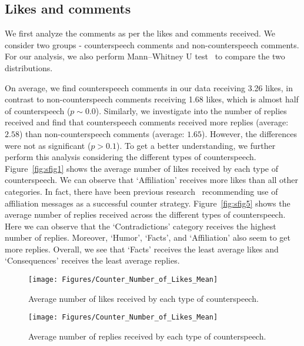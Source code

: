 \documentclass[11pt,a4paper]{article}
\newcommand{\TODO}[1]{\textcolor{red}{#1}}
\newcommand{\binny}[1]{\textcolor{blue}{[Binny: #1]}}
\begin{document}
{\subsection{Likes and comments}
We first analyze the comments as per the likes and comments received. We consider two groups - counterspeech comments and non-counterspeech comments. For our analysis, we also perform Mann–Whitney U test~\cite{mann1947test} to compare the two distributions. 




On average, we find counterspeech comments in our data receiving 3.26 likes, in contrast to non-counterspeech comments receiving 1.68 likes, which is almost half of counterspeech ($p\sim0.0$). Similarly, we investigate into the number of replies received and find that counterspeech comments received more replies (average: $2.58$) than non-counterspeech comments (average: $1.65$). However, the differences were not as significant ($p>0.1$). To get a better understanding, we further perform this analysis considering the different types of counterspeech. Figure~\ref{fig:sfig1} shows the average number of likes received by each type of counterspeech. We can observe that `Affiliation' receives more likes than all other categories. \iffalse\TODO{PG: but figure mentions identification}\binny{Corrected.}\fi In fact, there have been previous research~\citet{susan2016successfullcounter} recommending use of affiliation messages as a successful counter strategy.
Figure~\ref{fig:sfig5} shows the average number of replies received across the different types of counterspeech. Here we can observe that the `Contradictions' category receives the highest number of replies. Moreover, `Humor', `Facts', and `Affiliation' also seem to get more replies. Overall, we see that `Facts' receives the least average likes and `Consequences' receives the least average replies.\fi
\iffalse
\begin{figure*}[h]

	\begin{subfigure}[b]{0.45\textwidth}
		\texttt{[image: Figures/Counter\_Number\_of\_Likes\_Mean]}
		\caption{Average number of likes received by each type of counterspeech.}
		\label{fig:counter_num_likes}
	\end{subfigure}
	\qquad
	\centering	
	\begin{subfigure}[b]{0.45\textwidth}
		\texttt{[image: Figures/Counter\_Number\_of\_Likes\_Mean]}
		\caption{Average number of replies received by each type of counterspeech.}
		\label{fig:counter_num_replies}
	\end{subfigure}


\end{figure*}}
\end{document}
